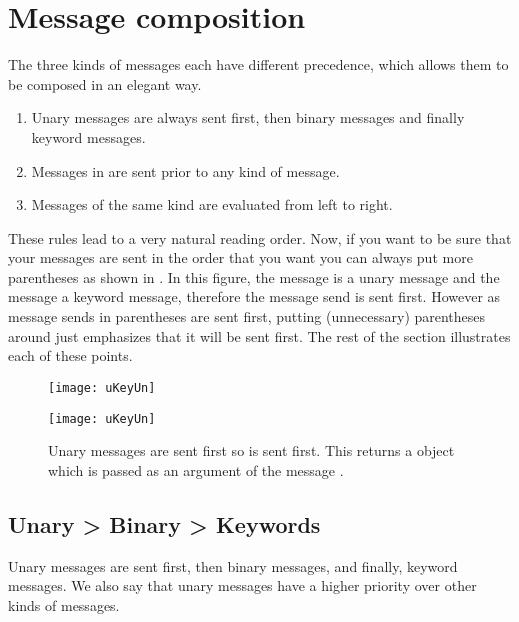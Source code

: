 \documentclass[a4paper,10pt,twoside]{book}
\begin{document}
\section{Message composition}
The three kinds of messages each have different precedence, which allows them to be composed in an elegant way.
\begin{enumerate}
\item Unary messages are always sent first, then binary messages and finally keyword messages.
\item Messages in  are sent prior to any kind of message.
\item Messages of the same kind are evaluated from left to right.
\end{enumerate}

These rules lead to a very natural reading order.
Now, if you want to be sure that your messages are sent in the order that you want you can always put more parentheses as shown in .
In this figure, the message  is a unary message and the message  a keyword message, therefore the message send  is sent first.
However as message sends in parentheses are sent first, putting (unnecessary) parentheses around  just emphasizes that it will be sent first.
The rest of the section illustrates each of these points.

\begin{figure}[ht]
\ifluluelse
	{\centerline{\texttt{[image: uKeyUn]}} }
	{\centerline{\texttt{[image: uKeyUn]}} }
\caption{Unary messages are sent first so  is sent first.
	This returns a  object which is passed as an argument of the message .\label{fig:uKeyUn}}
\end{figure}

\subsection*{Unary > Binary > Keywords}
Unary messages are sent first, then binary messages, and finally, keyword messages.
We also say that unary messages have a higher priority over other kinds of messages.

\end{document}
